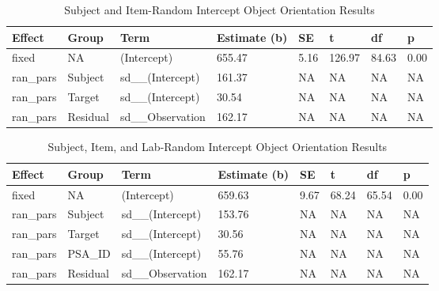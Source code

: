 \documentclass[
  man,floatsintext]{apa7}
\begin{document}
\begin{table}[tbp]

\begin{center}
\begin{threeparttable}

\caption{\label{tab:item}Subject and Item-Random Intercept Object Orientation Results}

\begin{tabular}{llllllll}
\toprule
Effect & Group & Term & Estimate (b) & SE & t & df & p\\
\midrule
fixed & NA & (Intercept) & 655.47 & 5.16 & 126.97 & 84.63 & 0.00\\
ran\_pars & Subject & sd\_\_(Intercept) & 161.37 & NA & NA & NA & NA\\
ran\_pars & Target & sd\_\_(Intercept) & 30.54 & NA & NA & NA & NA\\
ran\_pars & Residual & sd\_\_Observation & 162.17 & NA & NA & NA & NA\\
\bottomrule
\end{tabular}

\end{threeparttable}
\end{center}

\end{table}

\begin{table}[tbp]

\begin{center}
\begin{threeparttable}

\caption{\label{tab:lab}Subject, Item, and Lab-Random Intercept Object Orientation Results}

\begin{tabular}{llllllll}
\toprule
Effect & Group & Term & Estimate (b) & SE & t & df & p\\
\midrule
fixed & NA & (Intercept) & 659.63 & 9.67 & 68.24 & 65.54 & 0.00\\
ran\_pars & Subject & sd\_\_(Intercept) & 153.76 & NA & NA & NA & NA\\
ran\_pars & Target & sd\_\_(Intercept) & 30.56 & NA & NA & NA & NA\\
ran\_pars & PSA\_ID & sd\_\_(Intercept) & 55.76 & NA & NA & NA & NA\\
ran\_pars & Residual & sd\_\_Observation & 162.17 & NA & NA & NA & NA\\
\bottomrule
\end{tabular}

\end{threeparttable}
\end{center}

\end{table}
\end{document}
